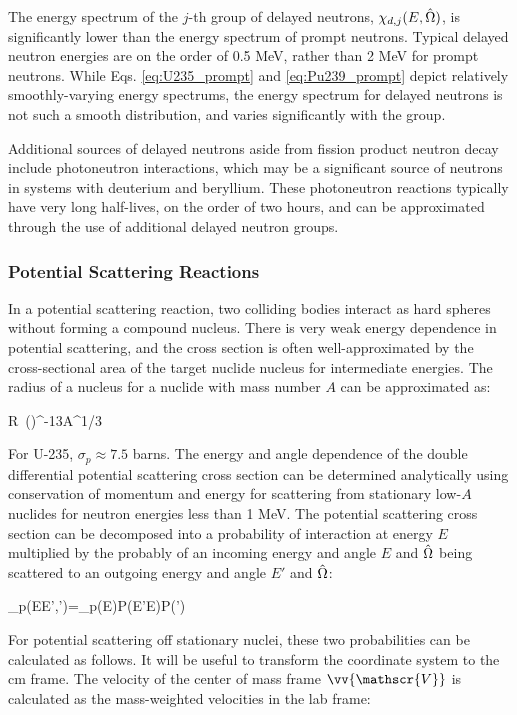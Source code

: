 The energy spectrum of the \(j\)-th group of delayed neutrons, \(\chi_{d,j}(E,\hat{\Omega})\), is significantly lower than the energy spectrum of prompt neutrons. Typical delayed neutron energies are on the order of 0.5 MeV, rather than 2 MeV for prompt neutrons. While Eqs. \eqref{eq:U235_prompt} and \eqref{eq:Pu239_prompt} depict relatively smoothly-varying energy spectrums, the energy spectrum for delayed neutrons is not such a smooth distribution, and varies significantly with the group.

Additional sources of delayed neutrons aside from fission product neutron decay include photoneutron interactions, which may be a significant source of neutrons in systems with deuterium and beryllium. These photoneutron reactions typically have very long half-lives, on the order of two hours, and can be approximated through the use of additional delayed neutron groups.

\subsubsection{Potential Scattering Reactions}
\label{sec:PotentialStationary}

In a potential scattering reaction, two colliding bodies interact as hard spheres without forming a compound nucleus. There is very weak energy dependence in potential scattering, and the cross section is often well-approximated by the cross-sectional area of the target nuclide nucleus for intermediate energies. The radius of a nucleus for a nuclide with mass number \(A\) can be approximated as:

\beq
R\ ()^{-13}A^{1/3}
\eeq

For U-235, \(\sigma_p\approx7.5\) barns. The energy and angle dependence of the double differential potential scattering cross section can be determined analytically using conservation of momentum and energy for scattering from stationary low-\(A\) nuclides for neutron energies less than 1 MeV. The potential scattering cross section can be decomposed into a probability of interaction at energy \(E\) multiplied by the probably of an incoming energy and angle \(E\) and \(\hat{\Omega}\) being scattered to an outgoing energy and angle \(E'\) and \(\hat{\Omega}\):

\beq
\label{eq:DifferentialSigma}
\sigma_p(E\rightarrow E',\hO\rightarrow\hO')=\sigma_p(E)P(E'\rightarrow E)P(\hO\rightarrow\hO')
\eeq

For potential scattering off stationary nuclei, these two probabilities can be calculated as follows. It will be useful to transform the coordinate system to the \gls{cm} frame. The velocity of the center of mass frame \(\vv{\mathscr{V}}\) is calculated as the mass-weighted velocities in the lab frame:

